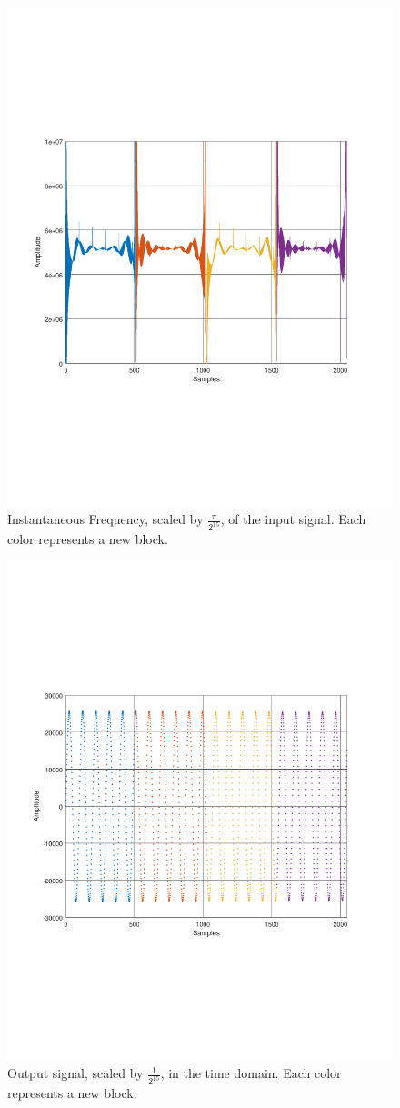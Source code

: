 \begin{figure}
	\centering
	\includegraphics[width=0.7\linewidth, clip, trim={2cm 7cm 2cm 7cm}]{gfx/Modelling/IF.pdf}
	\caption{Instantaneous Frequency, scaled by $\frac{\pi}{2^{15}}$, of the input signal. Each color represents a new block.}
	\label{fig:modelIF}
\end{figure}

\begin{figure}
	\centering
	\includegraphics[width=0.7\linewidth, clip, trim={2cm 7cm 2cm 7cm}]{gfx/Modelling/output.pdf}
	\caption{Output signal, scaled by $\frac{1}{2^{15}}$, in the time domain. Each color represents a new block.}
	\label{fig:modelout}
\end{figure}

\FloatBarrier